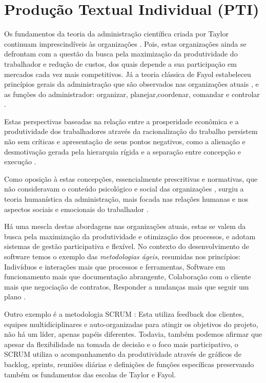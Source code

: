 \chapter{Produção Textual Individual (PTI)}
\label{pti}

Os fundamentos da teoria da administração científica
criada por Taylor continuam imprescindíveis às organizações \cite{matosfilho}.
Pois, estas organizações ainda se defrontam com
a questão da busca pela maximização da produtividade do trabalhador e redução de custos, dos quais depende
a sua participação em mercados cada vez mais competitivos.
Já a teoria clássica de Fayol estabeleceu princípios gerais da administração que são observados nas organizações atuais \cite{rsh},
e as funções do administrador: organizar, planejar,coordenar, comandar e controlar \cite{mota,trag,chiavenato}.

Estas perspectivas baseadas na relação entre a prosperidade econômica e a produtividade dos trabalhadores
através da racionalização do trabalho \cite{maximiano} persistem 
não sem críticas e apresentação de seus pontos negativos, como a alienação e desmotivação gerada
pela hierarquia rígida e a separação entre concepção e execução \cite{matospires}.

Como oposição à estas concepções, essencialmente prescritivas e normativas, que não consideravam o conteúdo psicológico e social das organizações \cite{chiavenato}, surgiu a teoria humanística
da administração, mais focada nas relações humanas e nos aspectos sociais e emocionais do trabalhador \cite{chiavenato}.

Há uma mescla destas abordagens nas organizações atuais, estas
se valem da busca pela maximização da produtividade e otimização dos
processos, e adotam sistemas de gestão participativa e flexível. No contexto
do desenvolvimento de software temos o exemplo das \textit{metodologias ágeis},
resumidas nos princípios:
Indivíduos e interações mais que processos e ferramentas,
Software em funcionamento mais que documentação abrangente,
Colaboração com o cliente mais que negociação de contratos,
Responder a mudanças mais que seguir um plano \cite{agil}.

Outro exemplo é a metodologia SCRUM \cite{scrum}:
Esta utiliza feedback dos clientes, equipes multidiciplinares e auto-organizadas para atingir os objetivos
do projeto, não há um líder, apenas papéis diferentes. Todavia, também
podemos afirmar que apesar da flexibilidade na tomada de decisão e o foco
mais participativo, o SCRUM utiliza o acompanhamento da
produtividade através de gráficos de backlog, sprints, reuniões diárias e definições
de funções específicas preservando também os fundamentos
das escolas de Taylor e Fayol.
